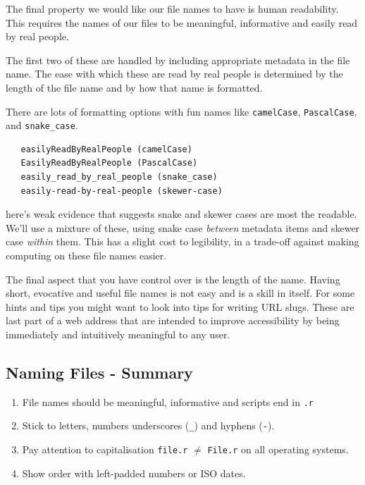 \documentclass[
  12pt,
]{book}
\begin{document}
The final property we would like our file names to have is human readability. This requires the names of our files to be meaningful, informative and easily read by real people.

The first two of these are handled by including appropriate metadata in the file name. The ease with which these are read by real people is determined by the length of the file name and by how that name is formatted.

There are lots of formatting options with fun names like \texttt{camelCase}, \texttt{PascalCase}, and \texttt{snake\_case}.

\begin{verbatim}
   easilyReadByRealPeople (camelCase)
   EasilyReadByRealPeople (PascalCase)
   easily_read_by_real_people (snake_case)
   easily-read-by-real-people (skewer-case)
\end{verbatim}

here's weak evidence that suggests snake and skewer cases are most the readable. We'll use a mixture of these, using snake case \emph{between} metadata items and skewer case \emph{within} them. This has a slight cost to legibility, in a trade-off against making computing on these file names easier.

The final aspect that you have control over is the length of the name. Having short, evocative and useful file names is not easy and is a skill in itself. For some hints and tips you might want to look into tips for writing URL slugs. These are last part of a web address that are intended to improve accessibility by being immediately and intuitively meaningful to any user.

\hypertarget{naming-files---summary}{%
\subsection{Naming Files - Summary}\label{naming-files---summary}}

\begin{enumerate}
\def\labelenumi{\arabic{enumi}.}
\item
  File names should be meaningful, informative and scripts end in \texttt{.r}
\item
  Stick to letters, numbers underscores (\texttt{\_}) and hyphens (\texttt{-}).
\item
  Pay attention to capitalisation \texttt{file.r} \(\neq\) \texttt{File.r} on all operating systems.
\item
  Show order with left-padded numbers or ISO dates.
\end{enumerate}
\end{document}
